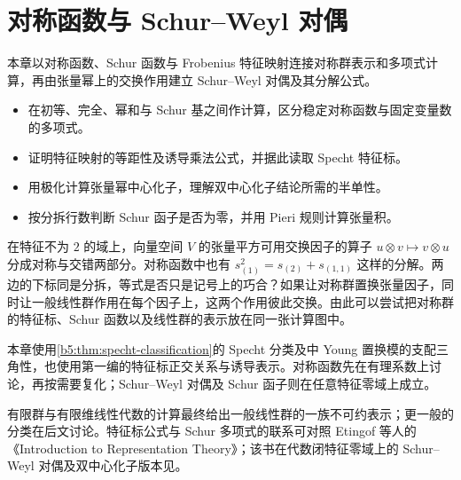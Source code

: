 
\chapter{对称函数与 Schur–Weyl 对偶}
\label{b5:ch:07}

\begin{chapterabstract}
	本章以对称函数、Schur 函数与 Frobenius 特征映射连接对称群表示和多项式计算，再由张量幂上的交换作用建立 Schur--Weyl 对偶及其分解公式。
\end{chapterabstract}

\begin{learninggoals}
	\begin{itemize}
		\item 在初等、完全、幂和与 Schur 基之间作计算，区分稳定对称函数与固定变量数的多项式。
		\item 证明特征映射的等距性及诱导乘法公式，并据此读取 Specht 特征标。
		\item 用极化计算张量幂中心化子，理解双中心化子结论所需的半单性。
		\item 按分拆行数判断 Schur 函子是否为零，并用 Pieri 规则计算张量积。
	\end{itemize}
\end{learninggoals}

在特征不为 \(2\) 的域上，向量空间 \(V\) 的张量平方可用交换因子的算子 \(u\otimes v\mapsto v\otimes u\) 分成对称与交错两部分。对称函数中也有 \(s_{(1)}^2=s_{(2)}+s_{(1,1)}\) 这样的分解。两边的下标同是分拆，等式是否只是记号上的巧合？如果让对称群置换张量因子，同时让一般线性群作用在每个因子上，这两个作用彼此交换。由此可以尝试把对称群的特征标、Schur 函数以及线性群的表示放在同一张计算图中。

\ProseParagraphBreak
本章使用\cref{b5:thm:specht-classification}的 Specht 分类及中 Young 置换模的支配三角性，也使用第一编的特征标正交关系与诱导表示。对称函数先在有理系数上讨论，再按需要复化；Schur--Weyl 对偶及 Schur 函子则在任意特征零域上成立。

\ProseParagraphBreak
有限群与有限维线性代数的计算最终给出一般线性群的一族不可约表示；更一般的分类在后文讨论。特征标公式与 Schur 多项式的联系可对照 Etingof 等人的《Introduction to Representation Theory》\cite[Sections 5.14--5.15, pp. 114--118; Sections 5.21--5.22, pp. 128--130]{EtingofEtAl2011RepresentationTheory}；该书在代数闭特征零域上的 Schur--Weyl 对偶及双中心化子版本见\cite[Sections 5.18--5.19, pp. 119--122]{EtingofEtAl2011RepresentationTheory}。


